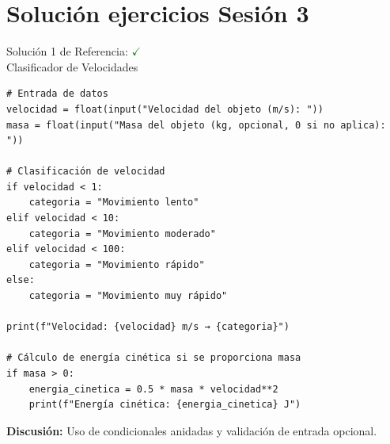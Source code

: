 \documentclass[10pt]{beamer}
\begin{document}
\myfront{}

\begin{frame}
  \titlepage
\end{frame}




\section{Solución ejercicios Sesión 3}

\begin{frame}[fragile]{Solución 1 de Referencia: \hfill \textcolor{green}{$\checkmark$} \\ Clasificador de Velocidades}
\begin{verbatim}
# Entrada de datos
velocidad = float(input("Velocidad del objeto (m/s): "))
masa = float(input("Masa del objeto (kg, opcional, 0 si no aplica): "))

# Clasificación de velocidad
if velocidad < 1:
    categoria = "Movimiento lento"
elif velocidad < 10:
    categoria = "Movimiento moderado"
elif velocidad < 100:
    categoria = "Movimiento rápido"
else:
    categoria = "Movimiento muy rápido"

print(f"Velocidad: {velocidad} m/s → {categoria}")

# Cálculo de energía cinética si se proporciona masa
if masa > 0:
    energia_cinetica = 0.5 * masa * velocidad**2
    print(f"Energía cinética: {energia_cinetica} J")
\end{verbatim}
\textbf{Discusión:} Uso de condicionales anidadas y validación de entrada opcional.
\end{frame}
\end{document}
